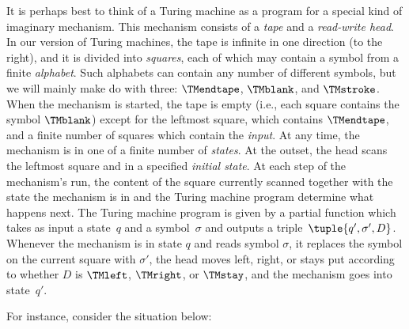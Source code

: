 \documentclass[../../../include/open-logic-section]{subfiles}
\begin{document}
\begin{explain}
It is perhaps best to think of a Turing
machine as a program for a special kind of imaginary mechanism. This
mechanism consists of a \emph{tape} and a \emph{read-write head}. In
our version of Turing machines, the tape is infinite in one direction
(to the right), and it is divided into \emph{squares}, each of which
may contain a symbol from a finite \emph{alphabet}. Such alphabets can
contain any number of different symbols, but we will mainly make do
with three: $\TMendtape$, $\TMblank$, and $\TMstroke$. When the
mechanism is started, the tape is empty (i.e., each square contains
the symbol $\TMblank$) except for the leftmost square, which contains
$\TMendtape$, and a finite number of squares which contain the
\emph{input}. At any time, the mechanism is in one of a finite number
of \emph{states}. At the outset, the head scans the leftmost square
and in a specified \emph{initial state}. At each step of the
mechanism's run, the content of the square currently scanned together
with the state the mechanism is in and the Turing machine program
determine what happens next. The Turing machine program is given by a
partial function which takes as input a state~$q$ and a
symbol~$\sigma$ and outputs a triple~$\tuple{q', \sigma',
  D}$. Whenever the mechanism is in state $q$ and reads symbol
$\sigma$, it replaces the symbol on the current square with $\sigma'$,
the head moves left, right, or stays put according to whether $D$ is
$\TMleft$, $\TMright$, or $\TMstay$, and the mechanism goes into
state~$q'$.

For instance, consider the situation below:

\begin{center}
  \usetikzlibrary{calc, chains, shapes, decorations.pathmorphing}
\end{center}
\end{explain}
\end{document}
